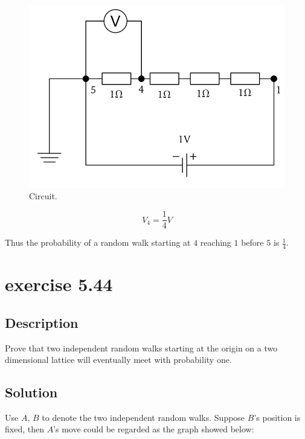 \documentclass[paper=a4, fontsize=11pt]{scrartcl} %
\numberwithin{equation}{section} %
\numberwithin{figure}{section} %
\numberwithin{table}{section} %
\begin{document}
\begin{figure}[H]
	\centering
	\includegraphics[width=350pt]{circuit.png}
	\caption{Circuit.}
\end{figure}

$$V_4 = \frac{1}{4} V $$

Thus the probability of a random walk starting at $4$ reaching $1$ before $5$ is $\frac{1}{4}$. 
\section*{exercise 5.44}
\subsection*{Description}
Prove that two independent random walks starting at the origin on a two dimensional lattice will eventually meet with probability one.
\subsection*{Solution}

Use $A$, $B$ to denote the two independent random walks. Suppose $B$'s position is fixed, then $A$'s move could be regarded as the graph showed below:
\end{document}

